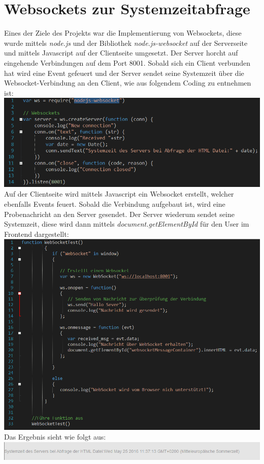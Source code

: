 \chapter{Websockets zur Systemzeitabfrage}
Eines der Ziele des Projekts war die Implementierung von Websockets, diese wurde mittels \textit{node.js} und der Bibliothek \textit{node.js-websocket}
auf der Serverseite und mittels Javascript auf der Clientseite umgesetzt. Der Server horcht auf eingehende Verbindungen auf dem Port 8001. Sobald sich ein Client verbunden hat wird eine Event gefeuert und der Server sendet seine Systemzeit \"uber die Websocket-Verbindung an den Client, wie aus folgendem Coding zu entnehmen ist:  
\newline
\includegraphics[width=1\textwidth]{img/vincent/abb02.png}
\newline
Auf der Clientseite wird mittels Javascript ein Websocket erstellt, welcher ebenfalls Events feuert. Sobald die Verbindung aufgebaut ist, wird eine Probenachricht an den Server gesendet. Der Server wiederum sendet seine Systemzeit, diese wird dann mittels \textit{document.getElementById} f\"ur den User im Frontend dargestellt: 
\newline
\includegraphics[width=1\textwidth]{img/vincent/abb03.png}
\newline
Das Ergebnis sieht wie folgt aus:
\newline
\includegraphics[width=1\textwidth]{img/vincent/abb17.png}
\newline
